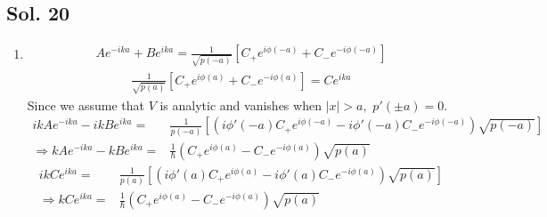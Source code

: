 \subsection*{Sol. 20}
\begin{enumerate}
    \item 
    \begin{align*}
    Ae^{-ika}+Be^{ika}
    =\frac{1}{\sqrt{p(-a)}}
    [C_+e^{i\phi(-a)}+C_-e^{-i\phi(-a)}]
\end{align*}
\begin{align*}
   \frac{1}{\sqrt{p(a)}}
    [C_+e^{i\phi(a)}+C_-e^{-i\phi(a)}]
    =Ce^{ika}
\end{align*}
Since we assume that $V$ is analytic and vanishes when $|x|>a,$ $p'(\pm a)=0.$
\begin{align*}
    ikAe^{-ika}-ikBe^{ika}
    =&\frac{1}{p(-a)}
    [(i\phi'(-a)C_+e^{i\phi(-a)}-i\phi'(-a)C_-e^{-i\phi(-a)})\sqrt{p(-a)}]\\
    \Rightarrow
    kAe^{-ika}-kBe^{ika}=&\frac{1}{\hbar}(C_+e^{i\phi(a)}-C_-e^{-i\phi(a)})\sqrt{p(a)}
\end{align*}
\begin{align*}
    ikCe^{ika}
    =&\frac{1}{p(a)}
    [(i\phi'(a)C_+e^{i\phi(a)}-i\phi'(a)C_-e^{-i\phi(a)})\sqrt{p(a)}]\\
    \Rightarrow 
    kCe^{ika}=&\frac{1}{\hbar}(C_+e^{i\phi(a)}-C_-e^{-i\phi(a)})\sqrt{p(a)}
\end{align*}


\end{enumerate}
